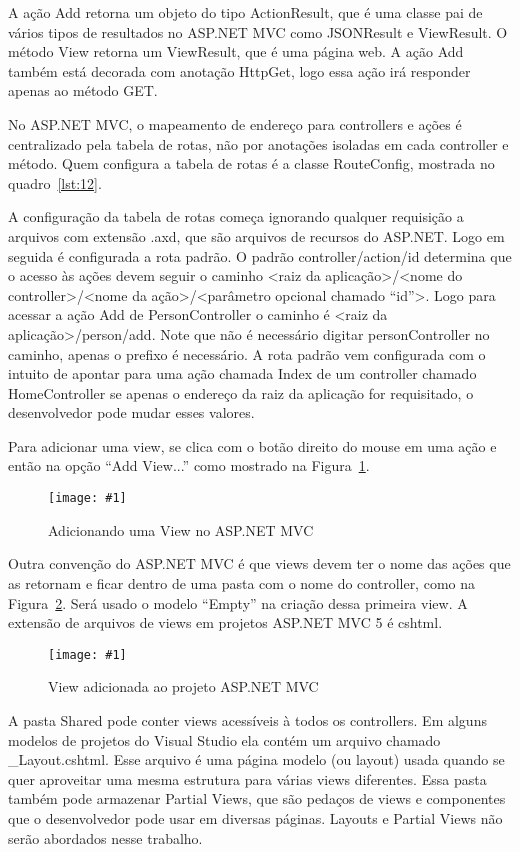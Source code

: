\documentclass[a4paper,12pt]{article}
\newcommand{\figura}[3] {
	\begin{figure}[ht]
		\centering
		\texttt{[image: \#1]}
		\caption{#2}
		\label{#3}
	\end{figure}
	\FloatBarrier
}
\newcommand{\sharpcode}[3] {
	
	\FloatBarrier
}
\begin{document}
\sharpcode{code/11.txt}{PersonController em C\#}{lst:11}

A ação Add retorna um objeto do tipo ActionResult, que é uma classe pai de vários tipos de resultados no ASP.NET MVC como JSONResult e ViewResult. O método View retorna um ViewResult, que é uma página web. A ação Add também está decorada com anotação HttpGet, logo essa ação irá responder apenas ao método GET.

No ASP.NET MVC, o mapeamento de endereço para controllers e ações é centralizado pela tabela de rotas, não por anotações isoladas em cada controller e método. Quem configura a tabela de rotas é a classe RouteConfig, mostrada no quadro~\ref{lst:12}.

\sharpcode{code/12.txt}{A classe RouteConfig}{lst:12}

A configuração da tabela de rotas começa ignorando qualquer requisição a arquivos com extensão .axd, que são arquivos de recursos do ASP.NET. Logo em seguida é configurada a rota padrão. O padrão {controller}/{action}/{id} determina que o acesso às ações devem seguir o caminho <raiz da aplicação>/<nome do controller>/<nome da ação>/<parâmetro opcional chamado “id”>. Logo para acessar a ação Add de PersonController o caminho é <raiz da aplicação>/person/add. Note que não é necessário digitar personController no caminho, apenas o prefixo é necessário. A rota padrão vem configurada com o intuito de apontar para uma ação chamada Index de um controller chamado HomeController se apenas o endereço da raiz da aplicação for requisitado, o desenvolvedor pode mudar esses valores. 

Para adicionar uma view, se clica com o botão direito do mouse em uma ação e então na opção “Add View...” como mostrado na Figura~\ref{fig:26}. 

\figura{26.png}{Adicionando uma View no ASP.NET MVC}{fig:26}

Outra convenção do ASP.NET MVC é que views devem ter o nome das ações que as retornam e ficar dentro de uma pasta com o nome do controller, como na Figura~\ref{fig:27}. Será usado o modelo “Empty” na criação dessa primeira view. A extensão de arquivos de views em projetos ASP.NET MVC 5 é cshtml.

\figura{27.png}{View adicionada ao projeto ASP.NET MVC}{fig:27}

A pasta Shared pode conter views acessíveis à todos os controllers. Em alguns modelos de projetos do Visual Studio ela contém um arquivo chamado \_Layout.cshtml. Esse arquivo é uma página modelo (ou layout) usada quando se quer aproveitar uma mesma estrutura para várias views diferentes. Essa pasta também pode armazenar Partial Views, que são pedaços de views e componentes que o desenvolvedor pode usar em diversas páginas. Layouts e Partial Views não serão abordados nesse trabalho.
\end{document}
